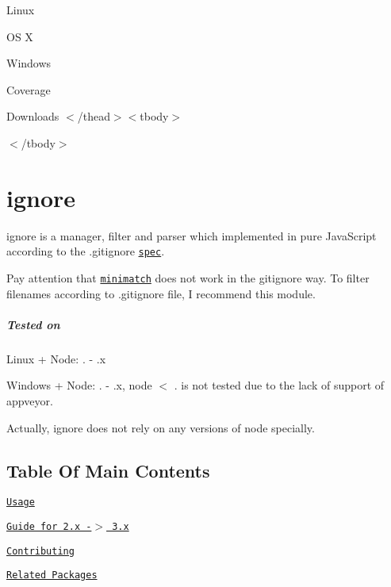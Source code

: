 \tabulinesep=1mm
\begin{longtabu} spread 0pt [c]{*{0}{|X[-1]}|}
\hline
\end{longtabu}


Linux 

OS X 

Windows 

Coverage 

Downloads  $<$/thead$>$$<$tbody$>$

\href{https://travis-ci.org/kaelzhang/node-ignore}{\tt }  

\href{https://ci.appveyor.com/project/kaelzhang/node-ignore}{\tt }  

\href{https://codecov.io/gh/kaelzhang/node-ignore}{\tt }  

\href{https://www.npmjs.org/package/ignore}{\tt }  $<$/tbody$>$

\section*{ignore}

{\ttfamily ignore} is a manager, filter and parser which implemented in pure Java\+Script according to the .gitignore \href{http://git-scm.com/docs/gitignore}{\tt spec}.

Pay attention that \href{https://www.npmjs.org/package/minimatch}{\tt {\ttfamily minimatch}} does not work in the gitignore way. To filter filenames according to .gitignore file, I recommend this module.

\subparagraph*{Tested on}


\begin{DoxyItemize}
\item Linux + Node\+: {.} -\/ {.\+x}
\item Windows + Node\+: {.} -\/ {.\+x}, node $<$ {.} is not tested due to the lack of support of appveyor.
\end{DoxyItemize}

Actually, {\ttfamily ignore} does not rely on any versions of node specially.

\subsection*{Table Of Main Contents}


\begin{DoxyItemize}
\item \href{#usage}{\tt Usage}
\item \href{#upgrade-2x---3x}{\tt Guide for 2.\+x -\/$>$ 3.\+x}
\item \href{#contributing}{\tt Contributing}
\item \href{#related}{\tt Related Packages}
\end{DoxyItemize}

